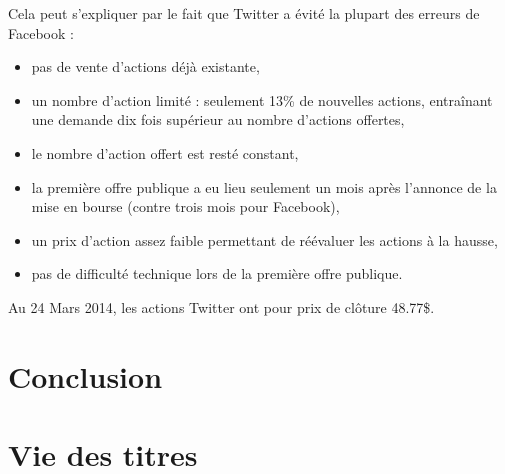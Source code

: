 \documentclass[a4paper,10pt]{article}
\begin{document}
Cela peut s'expliquer par le fait que Twitter a évité la plupart des erreurs de Facebook :
\begin{itemize}
\item pas de vente d'actions déjà existante,
\item un nombre d'action limité : seulement 13\% de nouvelles actions, entraînant une demande dix fois supérieur au nombre d'actions offertes,
\item le nombre d'action offert est resté constant,
\item la première offre publique a eu lieu seulement un mois après l'annonce de la mise en bourse (contre trois mois pour Facebook),
\item un prix d'action assez faible permettant de réévaluer les actions à la hausse,
\item pas de difficulté technique lors de la première offre publique.
\end{itemize}

Au 24 Mars 2014, les actions Twitter ont pour prix de clôture 48.77\$.

\section{Conclusion}

\section{Vie des titres}


\clearpage
\end{document}
